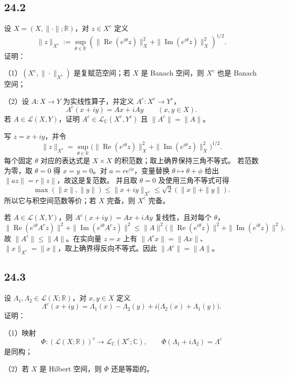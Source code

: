 \subsection*{24.2}
\begin{problem}
设 $X=(X,\|\cdot\|;\mathbb R)$，对 $z\in X^c$ 定义
\[
 \|z\|_{X^c}:=\sup_{\theta\in\mathbb R}
 \left(\|\operatorname{Re}(e^{i\theta}z)\|_X^2+
       \|\operatorname{Im}(e^{i\theta}z)\|_X^2\right)^{1/2}.
\]
证明：

（1）$(X^c,\|\cdot\|_{X^c})$ 是复赋范空间；若 $X$ 是 Banach 空间，则 $X^c$ 也是
Banach 空间；

（2）设 $A:X\to Y$ 为实线性算子，并定义
$A^c:X^c\to Y^c$，
\[
 A^c(x+iy)=Ax+iAy\qquad(x,y\in X).
\]
若 $A\in\mathcal L(X,Y)$，证明 $A^c\in\mathcal L_{\mathbb C}(X^c,Y^c)$ 且
$\|A^c\|=\|A\|$。
\end{problem}

写 $z=x+iy$，并令
\[
 \|z\|_{X^c}=\sup_{\theta\in\mathbb R}
 \bigl(\|\operatorname{Re}(e^{i\theta}z)\|_X^2+
       \|\operatorname{Im}(e^{i\theta}z)\|_X^2\bigr)^{1/2}.
\]
每个固定 $\theta$ 对应的表达式是 $X\times X$ 的积范数；取上确界保持三角不等式。
若范数为零，取 $\theta=0$ 得 $x=y=0$。对 $a=re^{i\phi}$，变量替换
$\theta\mapsto\theta+\phi$ 给出 $\|az\|=r\|z\|$，故这是复范数。
并且取 $\theta=0$ 及使用三角不等式可得
\[
 \max(\|x\|,\|y\|)\leq\|x+iy\|_{X^c}
 \leq\sqrt2(\|x\|+\|y\|).
\]
所以它与积空间范数等价；若 $X$ 完备，则 $X^c$ 完备。

若 $A\in\mathcal L(X,Y)$，则 $A^c(x+iy)=Ax+iAy$ 复线性，且对每个 $\theta$，
\[
 \|\operatorname{Re}(e^{i\theta}A^cz)\|^2+
 \|\operatorname{Im}(e^{i\theta}A^cz)\|^2
 \leq\|A\|^2\bigl(\|\operatorname{Re}(e^{i\theta}z)\|^2+
 \|\operatorname{Im}(e^{i\theta}z)\|^2\bigr).
\]
故 $\|A^c\|\leq\|A\|$。在实向量 $z=x$ 上有
$\|A^cx\|=\|Ax\|$、$\|x\|_{X^c}=\|x\|$，取上确界得反向不等式。因此
$\|A^c\|=\|A\|$。

\subsection*{24.3}
\begin{problem}
设 $\Lambda_1,\Lambda_2\in\mathcal L(X;\mathbb R)$，对 $x,y\in X$ 定义
\[
 \Lambda^c(x+iy)=\Lambda_1(x)-\Lambda_2(y)
 +i\bigl(\Lambda_2(x)+\Lambda_1(y)\bigr).
\]
证明：

（1）映射
\[
 \Phi:(\mathcal L(X;\mathbb R))^c\longrightarrow
 \mathcal L_{\mathbb C}(X^c;\mathbb C),
 \qquad \Phi(\Lambda_1+i\Lambda_2)=\Lambda^c
\]
是同构；

（2）若 $X$ 是 Hilbert 空间，则 $\Phi$ 还是等距的。
\end{problem}

